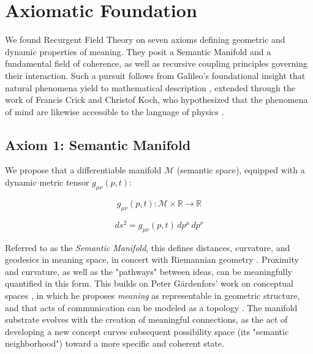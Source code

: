 \chapter{Axiomatic Foundation}
\label{1:axiomatic_foundation}

We found Recurgent Field Theory on seven axioms defining geometric and dynamic properties of meaning. They posit a Semantic Manifold and a fundamental field of coherence, as well as recursive coupling principles governing their interaction. Such a pursuit follows from Galileo's foundational insight that natural phenomena yield to mathematical description \autocite{Galilei1623}, extended through the work of Francis Crick and Christof Koch, who hypothesized that the phenomena of mind are likewise accessible to the language of physics \autocite{Crick1990, KochConsciousness2019}.


\section{Axiom 1: Semantic Manifold}
\label{1.1:axiom_1_semantic_manifold}

We propose that a differentiable manifold \(\mathcal{M}\) (semantic space), equipped with a dynamic metric tensor \(g_{\mu\nu}(p,t)\):

\begin{equation}
g_{\mu\nu}(p,t) : \mathcal{M} \times \mathbb{R} \rightarrow \mathbb{R}
\end{equation}

\begin{equation}
ds^2 = g_{\mu\nu}(p,t) \, dp^\mu \, dp^\nu
\end{equation}

Referred to as the \textit{Semantic Manifold}, this defines distances, curvature, and geodesics in meaning space, in concert with Riemannian geometry \autocite{Riemann1868}. Proximity and curvature, as well as the "pathways" between ideas, can be meaningfully quantified in this form. This builds on Peter Gärdenfors' work on conceptual spaces \autocite{Gardenfors2000}, in which he proposes \textit{meaning} as representable in geometric structure, and that acts of communication can be modeled as a topology \autocite{Gardenfors2014}. The manifold substrate evolves with the creation of meaningful connections, as the act of developing a new concept curves subsequent possibility space (its "semantic neighborhood") toward a more specific and coherent state.

